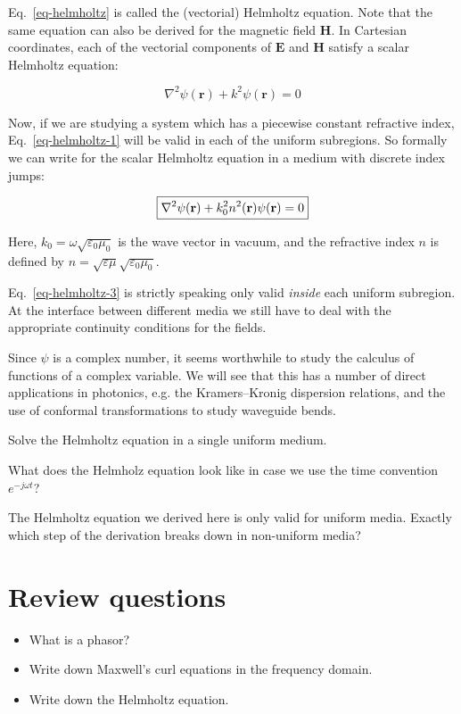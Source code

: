 Eq.~\ref{eq-helmholtz} is called the (vectorial) Helmholtz equation. Note that the same equation can also be derived for the magnetic field ${\mathbf H}$. In Cartesian coordinates, each of the vectorial components of ${\mathbf E}$ and ${\mathbf H}$ satisfy a scalar Helmholtz equation:

\begin{equation}
\nabla^2 \psi({\mathbf r}) + k^2 \psi({\mathbf r}) = 0 \label{eq-helmholtz-1}
\end{equation}

Now, if we are studying a system which has a piecewise constant refractive index, Eq.~\ref{eq-helmholtz-1} will be valid in each of the uniform subregions. So formally we can write for the scalar Helmholtz equation in a medium with discrete index jumps:

\begin{equation}
\fbox{$\displaystyle \nabla^2 \psi({\mathbf r}) + k_0^2 n^2({\mathbf r}) \psi({\mathbf r}) = 0
\label{eq-helmholtz-3}$}
\end{equation}

Here, $k_0=\omega \sqrt{\varepsilon_0 \mu_0}$ is the wave vector in vacuum, and the refractive index $n$ is defined by $n=\sqrt{\varepsilon \mu} \sqrt{\varepsilon_0 \mu_0}$.

Eq.~\ref{eq-helmholtz-3} is strictly speaking only valid \emph{inside} each uniform subregion. At the interface between different media we still have to deal with the appropriate continuity conditions for the fields.

Since $\psi$ is a complex number, it seems worthwhile to study the calculus of functions of a complex variable. We will see that this has a number of direct applications in photonics, e.g. the Kramers--Kronig dispersion relations, and the use of conformal transformations to study waveguide bends.

\begin{exer}
Solve the Helmholtz equation in a single uniform medium.
\end{exer}

\begin{exer}
What does the Helmholz equation look like in case we use the time convention  $e^{-j \omega t}$? 
\end{exer}

\begin{exer}
The Helmholtz equation we derived here is only valid for uniform media. Exactly which step of the derivation breaks down in non-uniform media?
\end{exer}

\section*{Review questions}

\begin{itemize}
\item What is a phasor?
\item Write down Maxwell's curl equations in the frequency domain.
\item Write down the Helmholtz equation.
\end{itemize}



